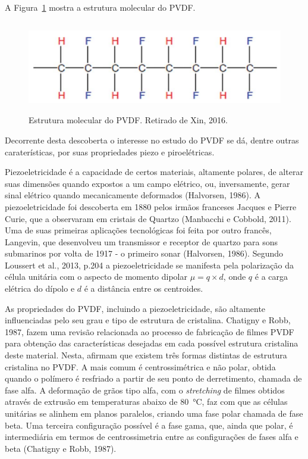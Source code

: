 \documentclass[
	12pt,				
	oneside,			
	a4paper,			
	english,			
	brazil,			
	]{abntex2ppgsi}
\begin{document}
A Figura~\ref{pvdf_cadeia} mostra a estrutura molecular do PVDF.

\begin{figure}[H]
\centering
\includegraphics[width=\textwidth,height=40mm,keepaspectratio]{pvdf_cadeia}
\caption {Estrutura molecular do PVDF. Retirado de Xin, 2016.}
\label{pvdf_cadeia}
\end{figure}

Decorrente desta descoberta o interesse no estudo do PVDF se dá, dentre outras caraterísticas, por suas propriedades piezo e piroelétricas. 

Piezoeletricidade é a capacidade de certos materiais, altamente polares, de alterar suas dimensões quando expostos a um campo elétrico, ou, inversamente, gerar sinal elétrico quando mecanicamente deformados (Halvorsen, 1986). A piezoeletricidade foi descoberta em 1880 pelos irmãos franceses Jacques e Pierre Curie, que a observaram em cristais de Quartzo (Manbacchi e Cobbold, 2011). Uma de suas primeiras aplicações tecnológicas foi feita por outro francês, Langevin, que desenvolveu um transmissor e receptor de quartzo para sons submarinos por volta de 1917 - o primeiro sonar (Halvorsen, 1986). Segundo Loussert et al., 2013, p.204 a piezoeletricidade se manifesta pela polarização da célula unitária com o aspecto de momento dipolar $\mu = q\times d$, onde $q$ é a carga elétrica do dípolo e $d$ é a distância entre os centroides.  

As propriedades do PVDF, incluindo a piezoeletricidade, são altamente influenciadas pelo seu grau e tipo de estrutura de cristalina. Chatigny e Robb, 1987, fazem uma revisão relacionada ao processo de fabricação de filmes PVDF para obtenção das características desejadas em cada possível estrutura cristalina deste material. Nesta, afirmam que existem três formas distintas de estrutura cristalina no PVDF. A mais comum é centrossimétrica e não polar, obtida quando o polímero é resfriado a partir de seu ponto de derretimento, chamada de fase alfa. A deformação de grãos tipo alfa, com o \textit{stretching} de filmes obtidos através de extrusão em temperaturas abaixo de \SI{80}{\celsius}, faz com que as células unitárias se alinhem em planos paralelos, criando uma fase polar chamada de fase beta. Uma terceira configuração possível é a fase gama, que, ainda que polar, é intermediária em termos de centrossimetria entre as configurações de fases alfa e beta (Chatigny e Robb, 1987).
\end{document}
